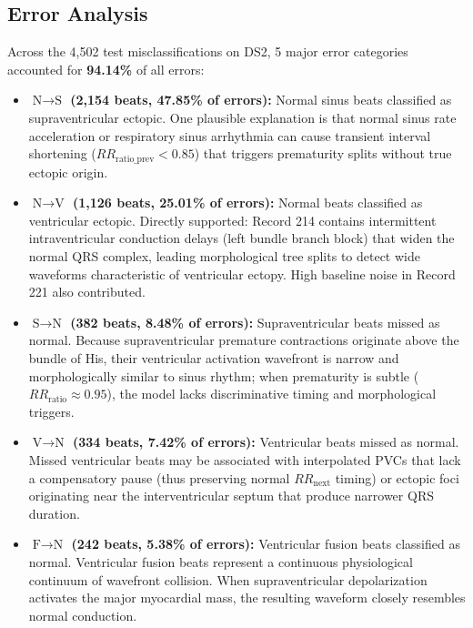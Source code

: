 \documentclass[conference]{IEEEtran}
\begin{document}
\subsection{Error Analysis}
Across the 4,502 test misclassifications on DS2, 5 major error categories accounted for \textbf{94.14\%} of all errors:
\begin{itemize}
    \item \textbf{$\text{N} \to \text{S}$ (2,154 beats, 47.85\% of errors):} Normal sinus beats classified as supraventricular ectopic. One plausible explanation is that normal sinus rate acceleration or respiratory sinus arrhythmia can cause transient interval shortening ($RR_{\text{ratio\_prev}} < 0.85$) that triggers prematurity splits without true ectopic origin.
    \item \textbf{$\text{N} \to \text{V}$ (1,126 beats, 25.01\% of errors):} Normal beats classified as ventricular ectopic. Directly supported: Record 214 contains intermittent intraventricular conduction delays (left bundle branch block) that widen the normal QRS complex, leading morphological tree splits to detect wide waveforms characteristic of ventricular ectopy. High baseline noise in Record 221 also contributed.
    \item \textbf{$\text{S} \to \text{N}$ (382 beats, 8.48\% of errors):} Supraventricular beats missed as normal. Because supraventricular premature contractions originate above the bundle of His, their ventricular activation wavefront is narrow and morphologically similar to sinus rhythm; when prematurity is subtle ($RR_{\text{ratio}} \approx 0.95$), the model lacks discriminative timing and morphological triggers.
    \item \textbf{$\text{V} \to \text{N}$ (334 beats, 7.42\% of errors):} Ventricular beats missed as normal. Missed ventricular beats may be associated with interpolated PVCs that lack a compensatory pause (thus preserving normal $RR_{\text{next}}$ timing) or ectopic foci originating near the interventricular septum that produce narrower QRS duration.
    \item \textbf{$\text{F} \to \text{N}$ (242 beats, 5.38\% of errors):} Ventricular fusion beats classified as normal. Ventricular fusion beats represent a continuous physiological continuum of wavefront collision. When supraventricular depolarization activates the major myocardial mass, the resulting waveform closely resembles normal conduction.
\end{itemize}
\end{document}
